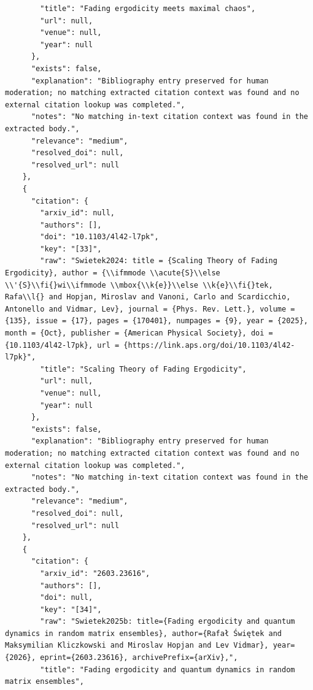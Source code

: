 \documentclass[11pt]{article}
\begin{document}
\begin{verbatim}
        "title": "Fading ergodicity meets maximal chaos",
        "url": null,
        "venue": null,
        "year": null
      },
      "exists": false,
      "explanation": "Bibliography entry preserved for human moderation; no matching extracted citation context was found and no external citation lookup was completed.",
      "notes": "No matching in-text citation context was found in the extracted body.",
      "relevance": "medium",
      "resolved_doi": null,
      "resolved_url": null
    },
    {
      "citation": {
        "arxiv_id": null,
        "authors": [],
        "doi": "10.1103/4l42-l7pk",
        "key": "[33]",
        "raw": "Swietek2024: title = {Scaling Theory of Fading Ergodicity}, author = {\\ifmmode \\acute{S}\\else \\'{S}\\fi{}wi\\ifmmode \\mbox{\\k{e}}\\else \\k{e}\\fi{}tek, Rafa\\l{} and Hopjan, Miroslav and Vanoni, Carlo and Scardicchio, Antonello and Vidmar, Lev}, journal = {Phys. Rev. Lett.}, volume = {135}, issue = {17}, pages = {170401}, numpages = {9}, year = {2025}, month = {Oct}, publisher = {American Physical Society}, doi = {10.1103/4l42-l7pk}, url = {https://link.aps.org/doi/10.1103/4l42-l7pk}",
        "title": "Scaling Theory of Fading Ergodicity",
        "url": null,
        "venue": null,
        "year": null
      },
      "exists": false,
      "explanation": "Bibliography entry preserved for human moderation; no matching extracted citation context was found and no external citation lookup was completed.",
      "notes": "No matching in-text citation context was found in the extracted body.",
      "relevance": "medium",
      "resolved_doi": null,
      "resolved_url": null
    },
    {
      "citation": {
        "arxiv_id": "2603.23616",
        "authors": [],
        "doi": null,
        "key": "[34]",
        "raw": "Swietek2025b: title={Fading ergodicity and quantum dynamics in random matrix ensembles}, author={Rafał Świętek and Maksymilian Kliczkowski and Miroslav Hopjan and Lev Vidmar}, year={2026}, eprint={2603.23616}, archivePrefix={arXiv},",
        "title": "Fading ergodicity and quantum dynamics in random matrix ensembles",

\end{verbatim}
\end{document}

